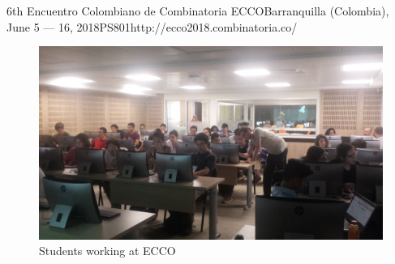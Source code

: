 \begin{event}{6th Encuentro Colombiano de Combinatoria }{ECCO}{Barranquilla (Colombia), June 5 --- 16, 2018}{PS}{80}{1}{http://ecco2018.combinatoria.co/}
\begin{figure}[ht]
\includegraphics[scale=.2]{ECCO.jpg}
\caption*{Students working at ECCO}
\end{figure}



\end{event}
